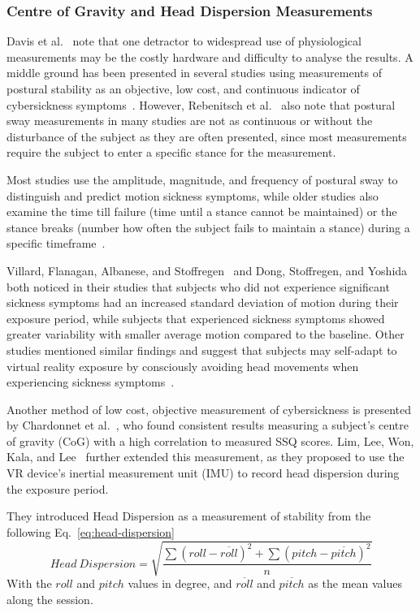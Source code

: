 \subsubsection{Centre of Gravity and Head Dispersion Measurements}\label{subsubsec:centre-of-gravity-and-head-dispersion-measurements}

Davis et al.~\cite{Davis2014} note that one detractor to widespread use of physiological measurements may be the
costly hardware and difficulty to analyse the results.
A middle ground has been presented in several studies using measurements of postural stability as an objective, low
cost, and continuous indicator of cybersickness symptoms~\cite{Rebenitsch2016}.
However, Rebenitsch et al.~\cite{Rebenitsch2016} also note that postural sway measurements in many studies are not as
continuous or without the disturbance of the subject as they are often presented, since most measurements require the
subject to enter a specific stance for the measurement.

Most studies use the amplitude, magnitude, and frequency of postural sway to distinguish and predict motion sickness
symptoms, while older studies also examine the time till failure (time until a stance cannot be maintained) or the
stance breaks (number how often the subject fails to maintain a stance) during a specific
timeframe~\cite{Rebenitsch2016}.

Villard, Flanagan, Albanese, and Stoffregen~\cite{Villard2008} and Dong, Stoffregen, and
Yoshida~\cite{Dong2011, Dong2010} both noticed in their studies that subjects who did not experience significant
sickness symptoms had an increased standard deviation of motion during their exposure period, while subjects that
experienced sickness symptoms showed greater variability with smaller average motion compared to the baseline.
Other studies mentioned similar findings and suggest that subjects may self-adapt to virtual reality exposure by
consciously avoiding head movements when experiencing sickness symptoms~\cite{Rebenitsch2016}.

Another method of low cost, objective measurement of cybersickness is presented by Chardonnet et
al.~\cite{Chardonnet2015}, who found consistent results measuring a subject's centre of gravity (CoG) with a high
correlation to measured SSQ scores.
Lim, Lee, Won, Kala, and Lee~\cite{Lim2020} further extended this measurement, as they proposed to use the VR device's
inertial measurement unit (IMU) to record head dispersion during the exposure period.

They introduced Head Dispersion as a measurement of stability from the following Eq.~\ref{eq:head-dispersion}
\begin{equation}
    \label{eq:head-dispersion}
    Head\ Dispersion = \sqrt{\frac{\sum(roll - \overline{roll})^2 + \sum{(pitch - \overline{pitch})^2}} {n}}
\end{equation}
With the $roll$ and $pitch$ values in degree, and $\overline{roll}$ and $\overline{pitch}$ as the mean values along
the session.

